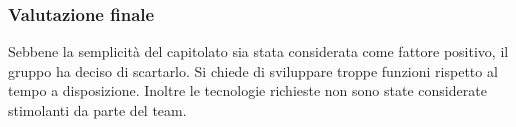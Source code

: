 \subsubsection{Valutazione finale}
Sebbene la semplicità del capitolato sia stata considerata come fattore positivo, il gruppo ha deciso di scartarlo. 
Si chiede di sviluppare troppe funzioni rispetto al tempo a disposizione.
Inoltre le tecnologie richieste non sono state considerate stimolanti da parte del team.
